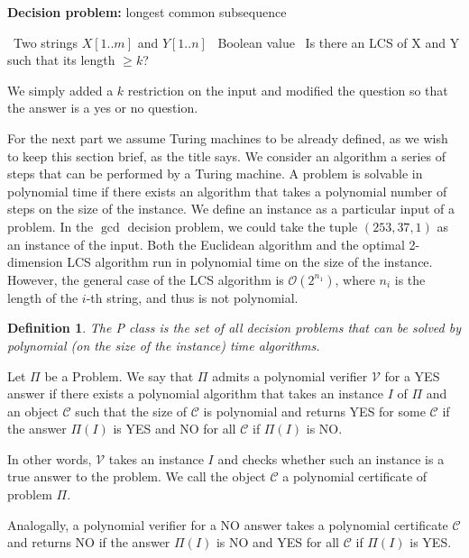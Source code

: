 \documentclass{amsart}
\theoremstyle{plain}
\newcounter{dummy-def}\numberwithin{dummy-def}{section}
\newtheorem{definition}[dummy-def]{Definition}
\newcounter{dummy-prop}\numberwithin{dummy-prop}{section}
\newcounter{dummy-corollary}\numberwithin{dummy-corollary}{section}
\newcounter{dummy-ex}\numberwithin{dummy-ex}{section}
\newcounter{dummy-eg}\numberwithin{dummy-eg}{section}
\newcommand{\bigo}{\mathcal{O}}
\newcommand{\verifier}{\mathcal{V}}
\begin{document}
\begin{algorithm}[h]
  \caption*{\textbf{Decision problem:} longest common subsequence}
  \begin{algorithmic}[1]
    \Require\, Two strings $X[1..m]$ and $Y[1..n]$
    \Ensure\, Boolean value
    \Description\, Is there an LCS of X and Y such that its length $\geq k$?
  \end{algorithmic}
\end{algorithm}

We simply added a $k$ restriction on the input and modified the question so that the answer is a
yes or no question.

For the next part we assume Turing machines to be already defined, as we wish to keep this section
brief, as the title says. We consider an algorithm a series of steps that can be performed by a
Turing machine. A problem is solvable in polynomial time if there exists an algorithm that takes a
polynomial number of steps on the size of the instance. We define an instance as a particular input
of a problem. In the $\gcd$ decision problem, we could take the tuple $(253, 37, 1)$ as an instance
of the input. Both the Euclidean algorithm and the optimal 2-dimension LCS algorithm run in
polynomial time on the size of the instance. However, the general case of the LCS algorithm is
$\bigo(2^{n_1})$, where $n_i$ is the length of the $i$-th string, and thus is not polynomial.

\begin{definition} The P class is the set of all decision problems that can be solved by polynomial
  (on the size of the instance) time algorithms.
\end{definition}

Let $\Pi$ be a Problem. We say that $\Pi$ admits a polynomial verifier $\verifier$ for a YES answer
if there exists a polynomial algorithm that takes an instance $I$ of $\Pi$ and an object
$\mathcal{C}$ such that the size of $\mathcal{C}$ is polynomial and returns YES for some
$\mathcal{C}$ if the answer $\Pi(I)$ is YES and NO for all $\mathcal{C}$ if $\Pi(I)$ is NO\@.

In other words, $\verifier$ takes an instance $I$ and checks whether such an instance is a true
answer to the problem. We call the object $\mathcal{C}$ a polynomial certificate of problem $\Pi$.

Analogally, a polynomial verifier for a NO answer takes a polynomial certificate $\mathcal{C}$ and
returns NO if the answer $\Pi(I)$ is NO and YES for all $\mathcal{C}$ if $\Pi(I)$ is YES\@.
\end{document}
